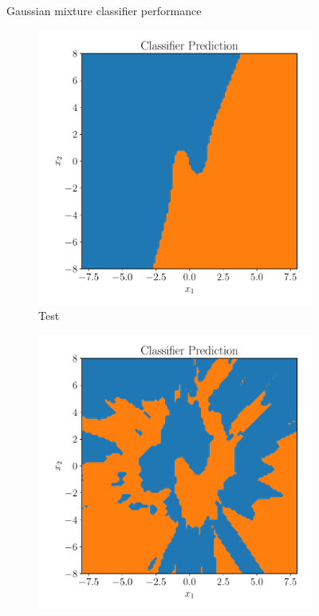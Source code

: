 \begin{figure}[htpb]
    \caption{Gaussian mixture classifier performance}%
    \label{fig:classifier_gmm}
\end{figure}

\begin{figure}[htpb]
    \centering
    \begin{subfigure}[]{0.4\textwidth}
        \centering
        \includegraphics[width=\linewidth]{figures/toy_example/moons/classifier_class.pdf}
        \caption{Test}
        \label{fig:moons_class}
    \end{subfigure}
    \begin{subfigure}[]{0.4\textwidth}
        \centering
        \includegraphics[width=\linewidth]{figures/toy_example/moons/classifier_kl_class.pdf}

\end{subfigure}
\end{figure}
